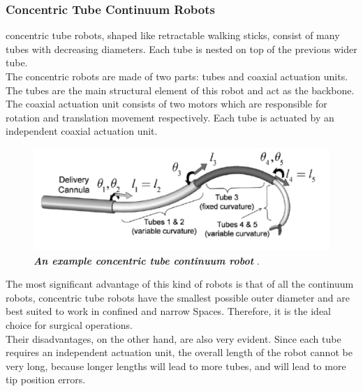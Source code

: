 \subsubsection{Concentric Tube Continuum Robots}
concentric tube robots, shaped like retractable walking sticks, consist of many tubes with decreasing diameters. Each tube is 
nested on top of the previous wider tube.  \\
The concentric robots are made of two parts: tubes and coaxial actuation units. The tubes are the main structural element of 
this robot and act as the backbone. The coaxial actuation unit consists of two motors which are responsible for rotation and 
translation movement respectively. Each tube is actuated by an independent coaxial actuation unit. 
\begin{figure}[H] %
    \centering %
    \captionsetup{labelsep=colon}
    \includegraphics[width=.9\textwidth]{Image/LR/concentric_tube_CR.PNG} 
    \caption[An example concentric tube continuum robot]
    {\centering \textit{\textbf{An example concentric tube continuum robot}} \cite{CTCR_example}.}
    \label{fig:CTCR_example}
\end{figure}
\noindent The most significant advantage of this kind of robots is that of all the continuum robots, concentric tube robots have the 
smallest possible outer diameter and are best suited to work in confined and narrow Spaces. Therefore, it is the ideal choice 
for surgical operations. \\
Their disadvantages, on the other hand, are also very evident. Since each tube requires an independent actuation unit, the 
overall length of the robot cannot be very long, because longer lengths will lead to more tubes, and will lead to more tip 
position errors.



\newpage